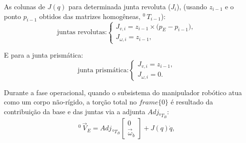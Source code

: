%
%
%
As colunas de $J(q)$ para determinada junta revoluta ($J_{i}$), (usando $z_{i-1}$ e o ponto $p_{i-1}$ obtidos das matrizes homogêneas, ${}^{0}\,T_{i-1}$):
\begin{equation}
    \label{eq:jac_columns_revoluta}
\text{juntas revolutas:}
\begin{cases}
J_{v,i} = z_{i-1} \times \big(p_{E} - p_{i-1}\big),\\
J_{\omega,i} = z_{i-1},
\end{cases}
\end{equation}

E para a junta prismática:
\begin{equation}
    \label{eq:jac_columns_prismatica}
\text{junta prismática:}
\begin{cases}
J_{v,i} = z_{i-1},\\
J_{\omega,i} = {0}.
\end{cases}
\end{equation}




Durante a fase operacional, quando o subsistema do manipulador robótico atua como um corpo não-rígido, a torção total no $frame \{0\}$ é resultado da contribuição da base e das juntas via a adjunta $Adj_{{}^{0}T_{B}}$:
\begin{equation}
    \label{eq:jac_com_base1}
{}^{0} \, \vec{V}_{E} =
Adj_{\,{}^{0}T_B}
\begin{bmatrix}
{0} \\
\vec{\omega}_b
\end{bmatrix}
+ J(q)\dot{q},
\end{equation}

